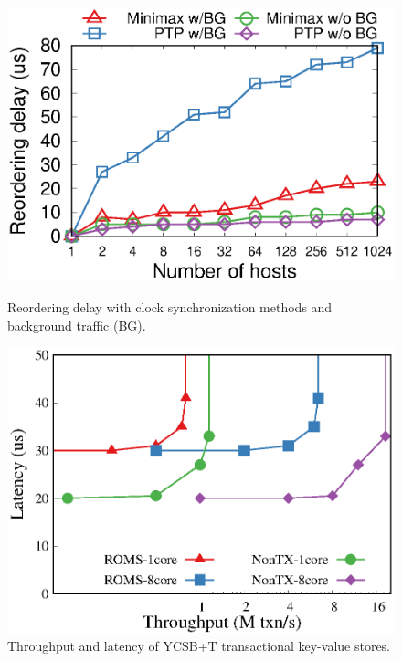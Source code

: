 \begin{figure}[t!]
\begin{minipage}{.31\textwidth}
		\centering
		\includegraphics[width=\textwidth]{gnuplot/reordering_delay.eps}
		\caption{Reordering delay with clock synchronization methods and background traffic (BG).}
		\label{fig:clock-sync}
	\end{minipage}
    \hspace{0.01\textwidth}
    \begin{minipage}{.31\textwidth}
    	\centering
		\includegraphics[width=\textwidth]{gnuplot/ycsb.eps}
		\caption{Throughput and latency of YCSB+T transactional key-value stores.}
		\label{fig:ycsb}


\end{minipage}
\end{figure}
